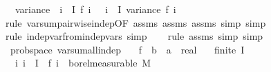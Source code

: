 \begin{isabellebody}
\ \ \ {\isachardoublequoteopen}variance\ {\isacharparenleft}{\kern0pt}{\isasymlambda}{\isasymomega}{\isachardot}{\kern0pt}\ {\isacharparenleft}{\kern0pt}{\isasymSum}i\ {\isasymin}\ I{\isachardot}{\kern0pt}\ f\ i\ {\isasymomega}{\isacharparenright}{\kern0pt}{\isacharparenright}{\kern0pt}\ {\isacharequal}{\kern0pt}\ {\isacharparenleft}{\kern0pt}{\isasymSum}i\ {\isasymin}\ I{\isachardot}{\kern0pt}\ variance\ {\isacharparenleft}{\kern0pt}f\ i{\isacharparenright}{\kern0pt}{\isacharparenright}{\kern0pt}{\isachardoublequoteclose}\isanewline
%
\isadelimproof
\ \ %
\endisadelimproof
%
\isatagproof
{}\isamarkupfalse%
\ {\isacharparenleft}{\kern0pt}rule\ var{\isacharunderscore}{\kern0pt}sum{\isacharunderscore}{\kern0pt}pairwise{\isacharunderscore}{\kern0pt}indep{\isacharbrackleft}{\kern0pt}OF\ assms{\isacharparenleft}{\kern0pt}{}{\isacharparenright}{\kern0pt}\ assms{\isacharparenleft}{\kern0pt}{}{\isacharparenright}{\kern0pt}\ assms{\isacharparenleft}{\kern0pt}{}{\isacharparenright}{\kern0pt}{\isacharbrackright}{\kern0pt}{\isacharcomma}{\kern0pt}\ simp{\isacharcomma}{\kern0pt}\ simp{\isacharparenright}{\kern0pt}\isanewline
\ \ \isamarkupfalse%
\ {\isacharparenleft}{\kern0pt}rule\ indep{\isacharunderscore}{\kern0pt}var{\isacharunderscore}{\kern0pt}from{\isacharunderscore}{\kern0pt}indep{\isacharunderscore}{\kern0pt}vars{\isacharcomma}{\kern0pt}\ simp{\isacharparenright}{\kern0pt}\isanewline
\ \ \isamarkupfalse%
\ {\isacharparenleft}{\kern0pt}rule\ assms{\isacharparenleft}{\kern0pt}{}{\isacharparenright}{\kern0pt}{\isacharcomma}{\kern0pt}\ simp{\isacharcomma}{\kern0pt}\ simp{\isacharparenright}{\kern0pt}%
\endisatagproof
{\isafoldproof}%
%
\isadelimproof
\isanewline
%
\endisadelimproof
\isanewline
{}\isamarkupfalse%
\ {\isacharparenleft}{\kern0pt}\ prob{\isacharunderscore}{\kern0pt}space{\isacharparenright}{\kern0pt}\ var{\isacharunderscore}{\kern0pt}sum{\isacharunderscore}{\kern0pt}all{\isacharunderscore}{\kern0pt}indep{\isacharcolon}{\kern0pt}\isanewline
\ \ \ f\ {\isacharcolon}{\kern0pt}{\isacharcolon}{\kern0pt}\ {\isachardoublequoteopen}{\isacharprime}{\kern0pt}b\ {\isasymRightarrow}\ {\isacharprime}{\kern0pt}a\ {\isasymRightarrow}\ real{\isachardoublequoteclose}\isanewline
\ \ \ {\isachardoublequoteopen}finite\ I{\isachardoublequoteclose}\isanewline
\ \ \ {\isachardoublequoteopen}{\isasymAnd}i{\isachardot}{\kern0pt}\ i\ {\isasymin}\ I\ {\isasymLongrightarrow}\ f\ i\ {\isasymin}\ borel{\isacharunderscore}{\kern0pt}measurable\ M{\isachardoublequoteclose}\isanewline

\end{isabellebody}
